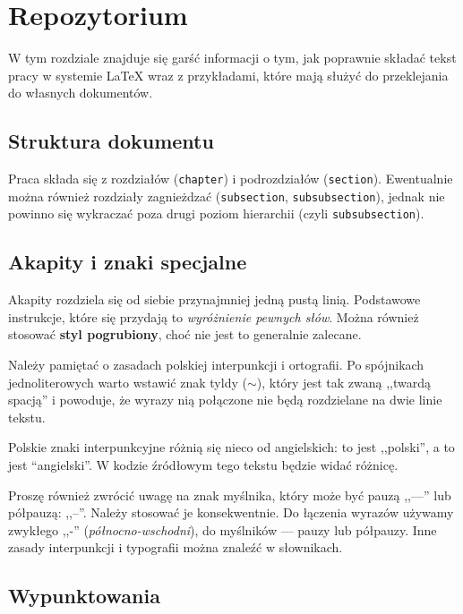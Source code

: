 
\chapter{Repozytorium}
\label{Chapter:Repository}

W tym rozdziale znajduje się
garść informacji o tym, jak poprawnie składać tekst pracy w systemie \LaTeX{} wraz z 
przykładami, które mają służyć do przeklejania do własnych dokumentów.

\section{Struktura dokumentu}

Praca składa się z rozdziałów (\texttt{chapter}) i podrozdziałów (\texttt{section}).
Ewentualnie można również rozdziały zagnieżdzać (\texttt{subsection}, \texttt{subsubsection}),
jednak nie powinno się wykraczać poza drugi poziom hierarchii (czyli \texttt{subsubsection}).

\section{Akapity i znaki specjalne}

Akapity rozdziela się od siebie przynajmniej jedną pustą linią. Podstawowe
instrukcje, które się przydają to \emph{wyróżnienie pewnych słów}. Można również
stosować \textbf{styl pogrubiony}, choć nie jest to generalnie zalecane.

Należy pamiętać o zasadach polskiej interpunkcji i ortografii. Po spójnikach 
jednoliterowych warto wstawić znak tyldy ($\sim$), który jest tak zwaną
,,twardą spacją'' i powoduje, że wyrazy nią połączone nie będą rozdzielane
na dwie linie tekstu.

Polskie znaki interpunkcyjne różnią się nieco od angielskich: to jest ,,polski'', a to jest
``angielski''. W kodzie źródłowym tego tekstu będzie widać różnicę.

Proszę również zwrócić uwagę na znak myślnika, który może być pauzą ,,---'' lub
półpauzą: ,,--''. Należy stosować je konsekwentnie. Do łączenia wyrazów używamy
zwykłego ,,-'' (\emph{północno-wschodni}), do myślników --- pauzy lub półpauzy.
Inne zasady interpunkcji i typografii można znaleźć w słownikach.

\section{Wypunktowania}

